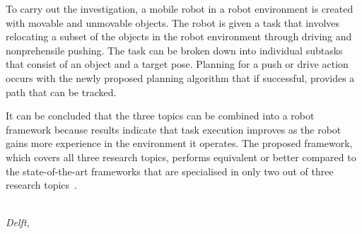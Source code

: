 To carry out the investigation, a mobile robot in a robot environment is created with movable and unmovable objects. The robot is given a task that involves relocating a subset of the objects in the robot environment through driving and nonprehensile pushing. The task can be broken down into individual subtasks that consist of an object and a target pose. Planning for a push or drive action occurs with the newly proposed planning algorithm that if successful, provides a path that can be tracked.\bs

It can be concluded that the three topics can be combined into a robot framework because results indicate that task execution improves as the robot gains more experience in the environment it operates. The proposed framework, which covers all three research topics, performs equivalent or better compared to the state-of-the-art frameworks that are specialised in only two out of three research topics~\cite{ellis_navigation_2022,sabbaghnovin_model_2021,scholz_navigation_2016,vega-brown_asymptotically_2020,wang_affordancebased_2020}.\bs

\begin{flushright}
{\makeatletter\itshape
    \@author\\
    Delft, \monthname{} \the\year{}
\makeatother}
\end{flushright}
